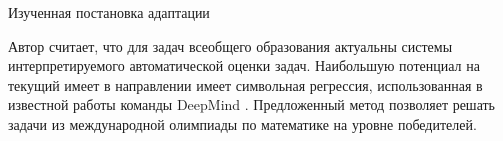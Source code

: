 Изученная постановка адаптации


Автор считает, что для задач всеобщего образования актуальны системы интерпретируемого автоматической оценки задач.
Наибольшую потенциал на текущий имеет в направлении имеет символьная регрессия,
использованная в известной работы команды DeepMind \cite{trinh2024solving}. Предложенный метод позволяет решать
задачи из международной олимпиады по математике на уровне победителей.




